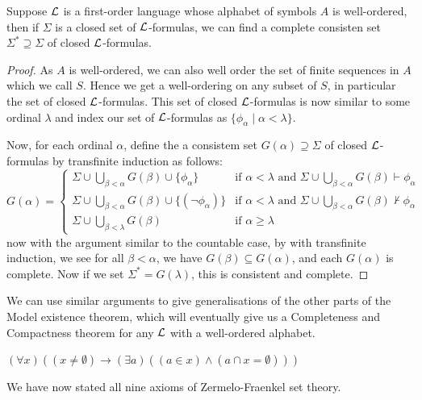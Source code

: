 \documentclass{article}
\begin{document}
\begin{proposition}
    Suppose $\mathcal{L}$ is a first-order language whose alphabet of symbols $A$ is well-ordered, then if $\Sigma$ is a closed set of $\mathcal{L}$-formulas, we can find a complete consisten set $\Sigma^*\supseteq \Sigma$ of closed $\mathcal{L}$-formulas.
    \begin{proof}
        As $A$ is well-ordered, we can also well order the set of finite sequences in $A$ which we call $S$. Hence we get a well-ordering on any subset of $S$, in particular the set of closed $\mathcal{L}$-formulas. This set of closed $\mathcal{L}$-formulas is now similar to some ordinal $\lambda$ and index our set of $\mathcal{L}$-formulas as $\{\phi_\alpha \mid \alpha < \lambda\}$.

        Now, for each ordinal $\alpha$, define the a consistem set $G(\alpha)\supseteq \Sigma$ of closed $\mathcal{L}$-formulas by transfinite induction as follows: \[
        G(\alpha) = \begin{cases}
            \displaystyle\Sigma \cup \bigcup_{\beta < \alpha}G(\beta) \cup \{\phi_\alpha\} & \text{if $\alpha < \lambda$ and }\displaystyle\Sigma \cup \bigcup_{\beta < \alpha}G(\beta)\vdash \phi_\alpha \\
            \displaystyle \Sigma \cup \bigcup_{\beta < \alpha} G(\beta) \cup \{(\neg\phi_{\alpha})\} & \text{if $\alpha <\lambda$ and } \displaystyle\Sigma \cup \bigcup_{\beta < \alpha}G(\beta)\nvdash \phi_\alpha\\
            \Sigma \cup \bigcup_{\beta < \lambda} G(\beta) & \text{if $\alpha \geq \lambda$}
        \end{cases}
        \]now with the argument similar to the countable case, by with transfinite induction, we see for all $\beta < \alpha$, we have $G(\beta) \subseteq G(\alpha)$, and each $G(\alpha)$ is complete. Now if we set $\Sigma^* = G(\lambda)$, this is consistent and complete.
    \end{proof}
\end{proposition}

We can use similar arguments to give generalisations of the other parts of the Model existence theorem, which will eventually give us a Completeness and Compactness theorem for any $\mathcal{L}$ with a well-ordered alphabet.

\begin{axiom}[Regularity]
    $(\forall x)((x\neq \emptyset) \rightarrow (\exists a)((a\in x) \wedge (a\cap x = \emptyset)))$
\end{axiom}

We have now stated all nine axioms of Zermelo-Fraenkel set theory.
\end{document}
